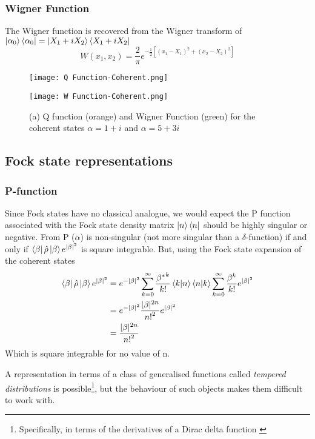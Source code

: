 \subsubsection{Wigner Function}
The Wigner function is recovered from the Wigner transform of $\ket{\alpha_0}\bra{\alpha_0} = \ket{X_1+iX_2}\bra{X_1+iX_2}$
\begin{equation}
	W(x_1, x_2) = \frac{2}{\pi} e^{-\frac{1}{2}[{(x_1-X_1)}^2+{(x_2-X_2)}^2]}
\end{equation}
\begin{figure}
  \begin{minipage}{0.5\linewidth}
          \texttt{[image: Q Function-Coherent.png]}
	\end{minipage}%
  \begin{minipage}{0.5\linewidth}
          \texttt{[image: W Function-Coherent.png]}
    \end{minipage}
  \caption{(a) Q function (orange) and Wigner Function (green) for the coherent states $\alpha = 1+i$ and $\alpha = 5+3i$}
\end{figure}
\subsection{Fock state representations}
\subsubsection{P-function}
Since Fock states have no classical analogue, we would expect the P function associated with the Fock state density matrix $\ket{n}\bra{n}$ should be highly singular or negative.
From \cite{Mehta1967}  P ($\alpha$) is non-singular (not more singular than a $\delta$-function) if and only if $ \bra{\beta} \hat{\rho} \ket{\beta} e^{|\beta|^2} $ is square integrable.
But, using the Fock state expansion of the coherent states
\begin{align}
	 \bra{\beta} \hat{\rho} \ket{\beta} e^{|\beta|^2}  &= e^{-|\beta|^2} \sum_{k=0}^\infty \frac {{\beta^*}^k}{k!} \braket{k}{n}\braket{n}{k} \sum_{k=0}^\infty \frac {\beta^k}{k!}e^{|\beta|^2} \\ &= e^{-|\beta|^2} \frac{|\beta|^{2n}}{{n!}^2} e^{|\beta|^2} \\ &= \frac{|\beta|^{2n}}{{n!}^2}
\end{align}
Which is square integrable for no value of n.

A representation in terms of a class of generalised functions called \emph{tempered distributions} is possible\footnote{Specifically, in terms of the derivatives of a Dirac delta function \cite{Gerry2005}}, but the behaviour of such objects makes them difficult to work with.
